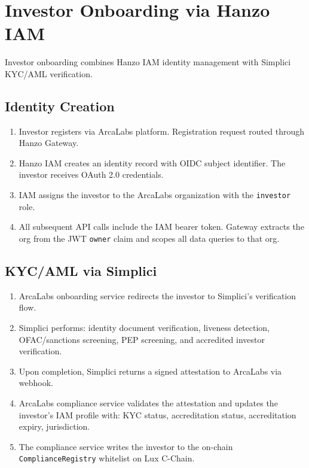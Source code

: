 \documentclass[11pt]{article}
\begin{document}
\section{Investor Onboarding via Hanzo IAM}
\label{sec:onboarding}

Investor onboarding combines Hanzo IAM identity management with Simplici
KYC/AML verification.

\subsection{Identity Creation}

\begin{enumerate}[leftmargin=1.4em]
    \item Investor registers via ArcaLabs platform. Registration request
    routed through Hanzo Gateway.
    \item Hanzo IAM creates an identity record with OIDC subject
    identifier. The investor receives OAuth 2.0 credentials.
    \item IAM assigns the investor to the ArcaLabs organization with
    the \texttt{investor} role.
    \item All subsequent API calls include the IAM bearer token. Gateway
    extracts the org from the JWT \texttt{owner} claim and scopes all
    data queries to that org.
\end{enumerate}

\subsection{KYC/AML via Simplici}

\begin{enumerate}[leftmargin=1.4em]
    \item ArcaLabs onboarding service redirects the investor to
    Simplici's verification flow.
    \item Simplici performs: identity document verification, liveness
    detection, OFAC/sanctions screening, PEP screening, and accredited
    investor verification.
    \item Upon completion, Simplici returns a signed attestation to
    ArcaLabs via webhook.
    \item ArcaLabs compliance service validates the attestation and
    updates the investor's IAM profile with: KYC status, accreditation
    status, accreditation expiry, jurisdiction.
    \item The compliance service writes the investor to the on-chain
    \texttt{ComplianceRegistry} whitelist on Lux C-Chain.
\end{enumerate}
\end{document}
